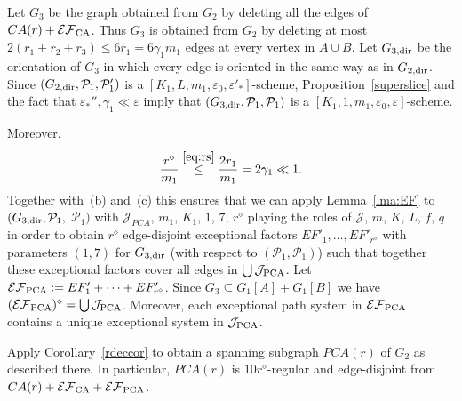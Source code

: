 \documentclass{memo-l}
\def\COMMENT#1{}
\def\cP{\mathcal{P}}
\def\eps{\varepsilon}
\def\cJ{\mathcal{J}}
\def\epszero{\eps_0}
\numberwithin{section}{chapter}
\numberwithin{equation}{section}
\numberwithin{firstthm}{section}
\numberwithin{figure}{section}
\begin{document}
{Let $G_3$ be the graph obtained from $G_2$ by deleting all the edges of $CA(r)+ \mathcal{EF}_{\rm CA}$.
Thus $G_3$ is obtained from $G_2$ by deleting at most $2(r_1+r_2+r_3)\le 6r_1=6\gamma_1m_1$ edges at every vertex in $A\cup B$.
Let $G_{3,{\rm dir}}$ be the orientation of $G_3$ in which every edge is oriented in the same way as in $G_{2,{\rm dir}}$.
Since $(G_{2,{\rm dir}}, \mathcal{P}_1,\cP'_1)$ is a $[K_1, L, m_1, \epszero,\eps'_*]$-scheme, 
Proposition~\ref{superslice} and the fact that $\eps_*'',\gamma_1 \ll \eps$ imply that 
$(G_{3,{\rm dir}},\cP_1, \cP_1)$ is a $[K_1, 1, m_1, \epszero,\eps]$-scheme.%
    \COMMENT{Deryk inserted `1' here and replaced $(G_{3,{\rm dir}},\cP_1)$ by $(G_{3,{\rm dir}},\cP_1, \cP_1)$}
Moreover,
$$\frac{r^\diamond}{m_1}\stackrel{\eqref{eq:rs}}{\le} \frac{2r_1}{m_1}=2\gamma_1\ll 1.$$
Together with~(b) and~(c) this ensures that we can apply
Lemma~\ref{lma:EF} to $(G_{3,{\rm dir}},\cP_1,$ $ \cP_1)$ with $\cJ_{PCA}$, $m_1$, $K_1$, $1$, $7$, $r^\diamond$ playing the roles of
$\cJ$, $m$, $K$, $L$, $f$, $q$ in order to obtain $r^\diamond$ edge-disjoint exceptional factors $EF'_1,\dots,EF'_{r^\diamond}$ with parameters $(1,7)$
for $G_{3,{\rm dir}}$ (with respect to $(\cP_1,\cP_1)$)
such that together these exceptional factors
cover all edges in $\bigcup \mathcal{J}_{\rm PCA}$. Let $\mathcal{EF}_{\rm PCA}:=EF'_1+\dots + EF'_{r^\diamond}$.
Since $G_3 \subseteq G_1[A] + G_1[B]$ we have $(\mathcal{EF}_{\rm PCA})^{\diamond} = \bigcup \mathcal{J}_{\rm PCA}$.
Moreover, each exceptional path system in $\mathcal{EF}_{\rm PCA}$ 
contains a unique exceptional system in $\mathcal{J}_{\rm PCA}$.



Apply Corollary~\ref{rdeccor} to obtain a spanning
subgraph $PCA(r)$ of $G_2$ as described there. In particular, $PCA(r)$ is $10r^\diamond$-regular
and edge-disjoint from $CA(r)+ \mathcal{EF}_{\rm CA}+ \mathcal{EF}_{\rm PCA}$.

}
\end{document}
